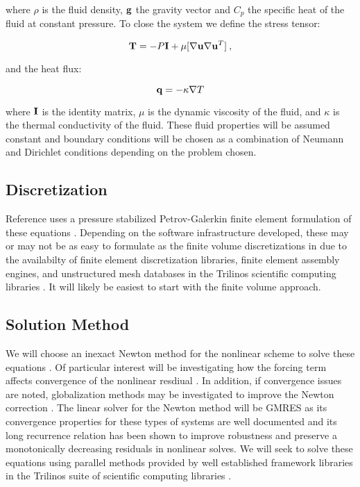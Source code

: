 \documentclass[letterpaper,12pt]{article}
\begin{document}
where $\rho$ is the fluid density, $\mathbf{g}$ the gravity vector and
$C_p$ the specific heat of the fluid at constant pressure. To close
the system we define the stress tensor:

\begin{equation}
  \mathbf{T} = -P \mathbf{I} + \mu [ \nabla \mathbf{u} \nabla \mathbf{u}^{T} ] \:,
  \label{eq:stress_tensor}
\end{equation}

and the heat flux:

\begin{equation}
  \mathbf{q} = -\kappa \nabla T
  \label{eq:heat_flux}
\end{equation}

where $\mathbf{I}$ is the identity matrix, $\mu$ is the dynamic
viscosity of the fluid, and $\kappa$ is the thermal conductivity of the
fluid. These fluid properties will be assumed constant and boundary
conditions will be chosen as a combination of Neumann and Dirichlet
conditions depending on the problem chosen.

\subsection{Discretization}
Reference \cite{shadid_1997} uses a pressure stabilized
Petrov-Galerkin finite element formulation of these equations
\cite{hughes_1986}. Depending on the software infrastructure
developed, these may or may not be as easy to formulate as the finite
volume discretizations in \cite{mchugh_1994} due to the availabilty of
finite element discretization libraries, finite element assembly
engines, and unstructured mesh databases in the Trilinos scientific
computing libraries \cite{trilinos_2005}. It will likely be easiest to
start with the finite volume approach.

\subsection{Solution Method}
We will choose an inexact Newton method for the nonlinear scheme to
solve these equations \cite{dembo_1982}. Of particular interest will
be investigating how the forcing term affects convergence of the
nonlinear resdiual \cite{eisenstat_1996}. In addition, if convergence
issues are noted, globalization methods may be investigated to improve
the Newton correction \cite{pawlowski_2006}. The linear solver for the
Newton method will be GMRES \cite{saad_1986} as its convergence
properties for these types of systems are well documented and its long
recurrence relation has been shown to improve robustness and preserve
a monotonically decreasing residuals in nonlinear solves. We will seek
to solve these equations using parallel methods provided by well
established framework libraries in the Trilinos suite of scientific
computing libraries \cite{trilinos_2005}.
\end{document}

